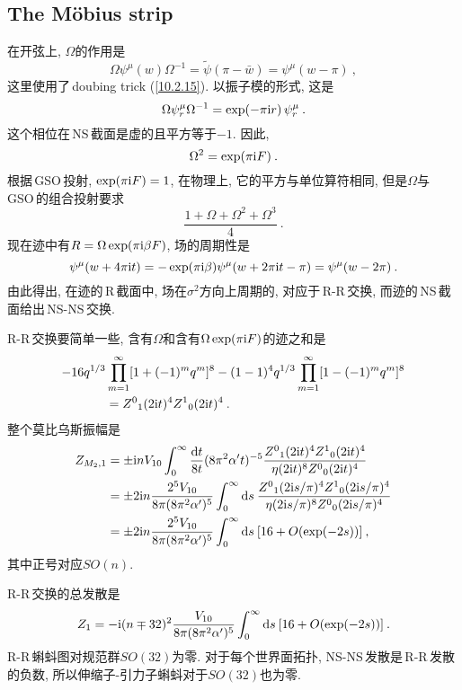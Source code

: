 \subsection*{The M\"{o}bius strip}

在开弦上, $\Omega $的作用是
\begin{equation}
    \Omega\psi^{\mu}(w)\Omega^{-1} =\tilde{\psi}(\pi-\bar{w})=\psi^{\mu}(w-\pi) \:,\label{10.8.12}
\end{equation}
这里使用了\,doubing trick (\ref{10.2.15}). 以振子模的形式, 这是
\begin{equation}
    \Omega \psi^{\mu}_{r} \Omega^{-1} =\exp(-\pi\mathrm{i} r) \,\psi_{r}^{\mu} \:. \label{10.8.13}
\end{equation}
这个相位在\,NS\,截面是虚的且平方等于$ -1$. 因此,
\begin{equation}
    \Omega^{2} =\exp(\pi\mathrm{i} F) \:. \label{10.8.14}
\end{equation}
根据\,GSO\,投射, $\exp(\pi\mathrm{i} F)=1$, 在物理上, 它的平方与单位算符相同, 但是$ \Omega $与\,GSO\,的组合投射要求
\begin{equation}
    \frac{1+\Omega +\Omega^{2}+\Omega^{3}}{4} \:. \label{10.8.15}
\end{equation}
现在迹中有$ R=\Omega \exp(\pi\mathrm{i}\beta F)$, 场的周期性是
\begin{equation}
    \psi^{\mu}(w+4\pi\mathrm{i} t) = -\exp(\pi\mathrm{i}\beta)\psi^{\mu}(w+2\pi\mathrm{i} t-\pi) =\psi^{\mu}(w-2\pi) \:. \label{10.8.16}
\end{equation}
由此得出, 在迹的\,R\,截面中, 场在$ \sigma^{2} $方向上周期的, 对应于\,R-R\,交换, 而迹的\,NS\,截面给出\,NS-NS\,交换.

R-R\,交换要简单一些, 含有$ \Omega $和含有$ \Omega\exp(\pi\mathrm{i} F) $的迹之和是
\begin{align}
    -16q^{1/3}&\prod_{m=1}^{\infty} [1+(-1)^{m}q^{m}]^{8} 
    -(1-1)^{4}q^{1/3}\prod_{m=1}^{\infty} [1-(-1)^{m}q^{m}]^{8} \nonumber \\
    &= Z^{0}{}_{1}(2\mathrm{i} t)^{4} Z^{1}{}_{0}(2\mathrm{i} t)^{4} \:. \label{10.8.17}
\end{align}
整个莫比乌斯振幅是
\begin{align}
    Z_{M_{2},1}&=\pm\mathrm{i} n V_{10} \int_{0}^{\infty} \frac{\mathrm{d} t}{8t}(8\pi^{2}\alpha^{\prime}t)^{-5}
    \frac{Z^{0}{}_{1}(2\mathrm{i} t)^{4}Z^{1}{}_{0}(2\mathrm{i} t)^{4}}{\eta(2\mathrm{i} t)^{8}Z^{0}{}_{0}(2\mathrm{i} t)^{4}}\nonumber \\
    &=\pm 2\mathrm{i} n \frac{2^{5}V_{10}}{8\pi(8\pi^{2}\alpha^{\prime})^{5}}\int_{0}^{\infty}\mathrm{d} s \:
    \frac{Z^{0}{}_{1}(2\mathrm{i} s/\pi)^{4}Z^{1}{}_{0}(2\mathrm{i} s/\pi)^{4}}{\eta(2\mathrm{i} s/\pi)^{8}Z^{0}{}_{0}(2\mathrm{i} s/\pi)^{4}}\nonumber \\
    &=\pm 2\mathrm{i} n \frac{2^{5}V_{10}}{8\pi(8\pi^{2}\alpha^{\prime})^{5}}\int_{0}^{\infty}\mathrm{d} s \:
    [16+O(\exp(-2s))] \:, \label{10.8.18}
\end{align}
其中正号对应$ SO(n)$.

R-R\,交换的总发散是
\begin{equation}
    Z_{1} = -\mathrm{i}(n\mp 32)^{2} \frac{V_{10}}{8\pi (8\pi^{2}\alpha^{\prime})^{5}}
    \int^{\infty}_{0}\mathrm{d} s \:[16+O(\exp(-2s))] \:. \label{10.8.19}
\end{equation}
R-R\,蝌蚪图对规范群$ SO(32) $为零. 对于每个世界面拓扑, NS-NS\,发散是\,R-R\,发散的负数, 所以伸缩子-引力子蝌蚪对于$ SO(32) $也为零.
